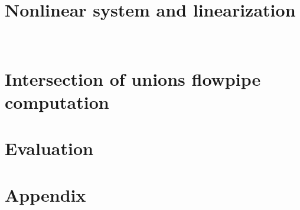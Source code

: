 \section{Nonlinear system and linearization}~\label{sec:system}

%
\section{Intersection of unions flowpipe computation}


\section{Evaluation}





\section{Appendix}










